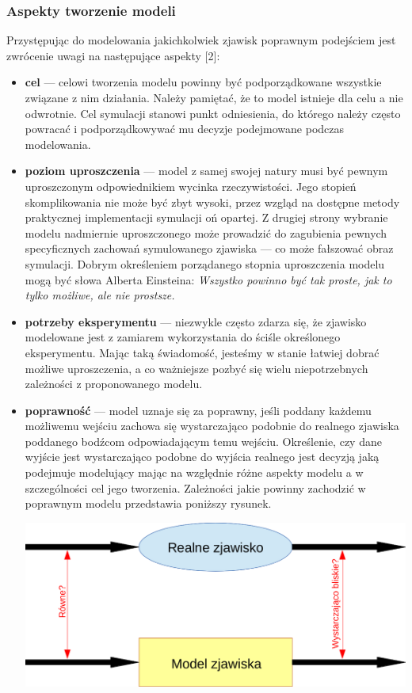\subsubsection{Aspekty tworzenie modeli}
\par{
Przystępując do modelowania jakichkolwiek zjawisk poprawnym podejściem jest zwrócenie uwagi na następujące aspekty [2]:
\begin{itemize}
\item \textbf{cel} --- celowi tworzenia modelu powinny być podporządkowane wszystkie związane z nim działania. Należy pamiętać, że to model istnieje dla celu a nie odwrotnie. Cel symulacji stanowi punkt odniesienia, do którego należy często powracać i podporządkowywać mu decyzje podejmowane podczas modelowania.
\item \textbf{poziom uproszczenia} --- model z samej swojej natury musi być pewnym uproszczonym odpowiednikiem wycinka rzeczywistości. Jego stopień skomplikowania nie może być zbyt wysoki, przez wzgląd na dostępne metody praktycznej implementacji symulacji oń opartej. Z drugiej strony wybranie modelu nadmiernie uproszczonego może prowadzić do zagubienia pewnych specyficznych zachowań symulowanego zjawiska --- co może fałszować obraz symulacji. Dobrym określeniem porządanego stopnia uproszczenia modelu mogą być słowa Alberta Einsteina: \textit{Wszystko powinno być tak proste, jak to tylko możliwe, ale nie prostsze.}
\item \textbf{potrzeby eksperymentu} --- niezwykle często zdarza się, że zjawisko modelowane jest z zamiarem wykorzystania do ściśle określonego eksperymentu. Mając taką świadomość, jesteśmy w stanie łatwiej dobrać możliwe uproszczenia, a co ważniejsze pozbyć się wielu niepotrzebnych zależności z proponowanego modelu.
\item \textbf{poprawność} --- model uznaje się za poprawny, jeśli poddany każdemu możliwemu wejściu zachowa się wystarczająco podobnie do realnego zjawiska poddanego bodźcom odpowiadającym temu wejściu. Określenie, czy dane wyjście jest wystarczająco podobne do wyjścia realnego jest decyzją jaką podejmuje modelujący mając na względnie różne aspekty modelu a w szczególności cel jego tworzenia. Zależności jakie powinny zachodzić w poprawnym modelu przedstawia poniższy rysunek.
\par{
\begin{center}
\includegraphics[width=\textwidth,keepaspectratio]{img/poprawnosc_modelu}

\end{center}}
\end{itemize}}
